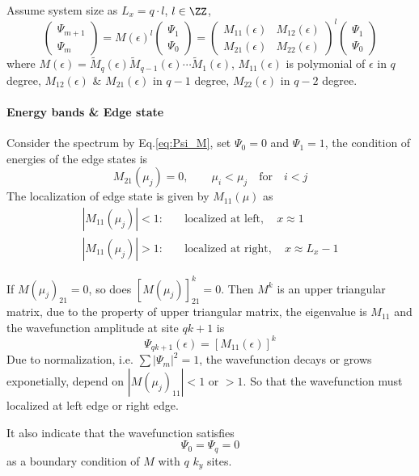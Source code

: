\documentclass[12pt,a4paper]{article}
\begin{document}
    Assume system size as $L_x = q\cdot l$, $l\in \ZZ$,
    \begin{equation}
    \label{eq:Psi_M}
        \begin{pmatrix}
            \Psi_{m+1} \\ \Psi_m
        \end{pmatrix}
        =
        M(\epsilon)^l
        \begin{pmatrix}
            \Psi_{1} \\ \Psi_{0}
        \end{pmatrix}
        =
        \begin{pmatrix}
            M_{11}(\epsilon) & M_{12}(\epsilon) \\ M_{21}(\epsilon) & M_{22}(\epsilon)
        \end{pmatrix}^l
        \begin{pmatrix}
            \Psi_{1} \\ \Psi_{0}
        \end{pmatrix}
    \end{equation}
    where $M(\epsilon) = \tilde{M}_q(\epsilon)\tilde{M}_{q-1}(\epsilon)\cdots\tilde{M}_1(\epsilon)$, $M_{11}(\epsilon)$ is polymonial of $\epsilon$ in $q$ degree, $M_{12}(\epsilon)$ \& $M_{21}(\epsilon)$ in $q-1$ degree, $M_{22}(\epsilon)$ in $q-2$ degree.


\paragraph{Energy bands \& Edge state}

    Consider the spectrum by Eq.\eqref{eq:Psi_M}, set $\Psi_0 = 0$ and $\Psi_1 = 1$, the condition of energies of the edge states is
    \begin{equation}
    \label{eq:M21}
        M_{21}(\mu_j) = 0, \qquad
        \mu_i < \mu_j \quad \text{for} \quad i<j
    \end{equation}
    The localization of edge state is given by $M_11(\mu)$ as
    \begin{equation}
    \begin{aligned}
        |M_{11}(\mu_j)| < 1 :& \quad \text{localized at left}, \quad  x \approx 1 \\
        |M_{11}(\mu_j)| > 1 :& \quad \text{localized at right}, \quad  x \approx L_x - 1
    \end{aligned}
    \end{equation}
    \begin{prf}
        If $M(\mu_j)_{21} = 0$, so does $\left[M(\mu_j)\right]^k_{21} = 0$. Then $M^k$ is an upper triangular matrix, due to the property of upper triangular matrix, the eigenvalue is $M_{11}$ and the wavefunction amplitude at site $qk+1$ is
        \[
            \Psi_{qk+1}(\epsilon) = \left[M_{11}(\epsilon) \right]^k
        \]
        Due to normalization, i.e. $\sum|\Psi_m|^2 = 1$, the wavefunction decays or grows exponetially, depend on $|M(\mu_j)_{11}| <1$ or $>1$. So that the wavefunction must localized at left edge or right edge.
    \end{prf}
    It also indicate that the wavefunction satisfies
    \[
        \Psi_0 = \Psi_q = 0
    \]
    as a boundary condition of $M$ with $q$ $k_y$ sites.
\end{document}
